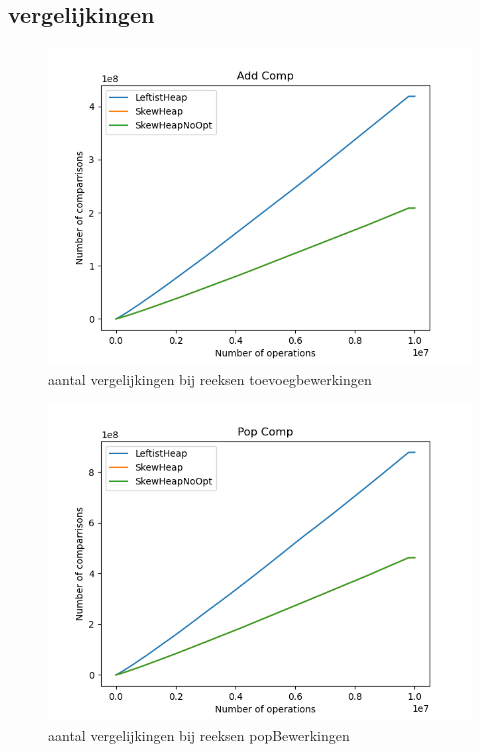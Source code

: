 \documentclass[10pt,a4paper,twoside]{article}
\begin{document}
\subsection{vergelijkingen}
\begin{figure}[H]
    \centering
    \includegraphics[width=0.85\linewidth]{graphs/AddComp.png}
    \caption{aantal vergelijkingen bij reeksen toevoegbewerkingen}
    \label{fig:addBenchComp}
\end{figure}
\begin{figure}
    \centering
    \includegraphics[width=0.85\linewidth]{graphs/PopComp.png}
    \caption{aantal vergelijkingen bij reeksen popBewerkingen}
    \label{fig:popBenchComp}
\end{figure}
\end{document}
